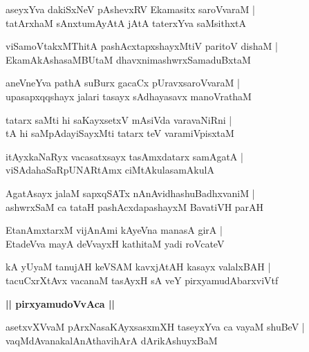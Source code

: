 \documentclass[twoside,12pt,openright]{book}
\newcounter{shloka}[chapter]
\def\uvaca#1{\centerline{{\large\textbf{#1}}}}
\begin{document}
\begin{shloka}%
aseyxYva dakiSxNeV pAshevxRV Ekamasitx saroVvaraM |\\
tatArxhaM sAnxtumAyAtA jAtA taterxYva saMsithxtA 
\end{shloka}

\begin{shloka}%
viSamoVtakxMThitA pashAcxtapxshayxMtiV paritoV dishaM |\\
EkamAkAshasaMBUtaM dhavxnimashwrxSamaduBxtaM 
\end{shloka}

\begin{shloka}%
aneVneYva pathA suBurx gacaCx pUravxsaroVvaraM |\\
upasapxqqshayx jalari tasayx sAdhayasavx manoVrathaM 
\end{shloka}

\begin{shloka}%
tatarx saMti hi saKayxsetxV mAsiVda varavaNiRni |\\
tA hi saMpAdayiSayxMti tatarx teV varamiVpisxtaM 
\end{shloka}

\begin{shloka}%
itAyxkaNaRyx vacasatxsayx tasAmxdatarx samAgatA |\\
viSAdahaSaRpUNARtAmx ciMtAkulasamAkulA 
\end{shloka}

\begin{shloka}%
AgatAsayx jalaM sapxqSATx nAnAvidhashuBadhxvaniM |\\
ashwrxSaM ca tataH pashAcxdapashayxM BavatiVH parAH 
\end{shloka}

\begin{shloka}%
EtanAmxtarxM vijAnAmi kAyeVna manasA girA |\\
EtadeVva mayA deVvayxH kathitaM yadi roVcateV 
\end{shloka}

\begin{shloka}%
kA yUyaM tanujAH keVSAM kavxjAtAH kasayx valalxBAH |\\
tacuCxrXtAvx vacanaM tasAyxH sA veY pirxyamudAbarxviVtf 
\end{shloka}

\uvaca{|| pirxyamudoVvAca ||}

\begin{shloka}%
asetxvXVvaM pArxNasaKAyxsasxmXH taseyxYva ca vayaM shuBeV |\\
vaqMdAvanakalAnAthavihArA dArikAshuyxBaM 
\end{shloka}
\end{document}

